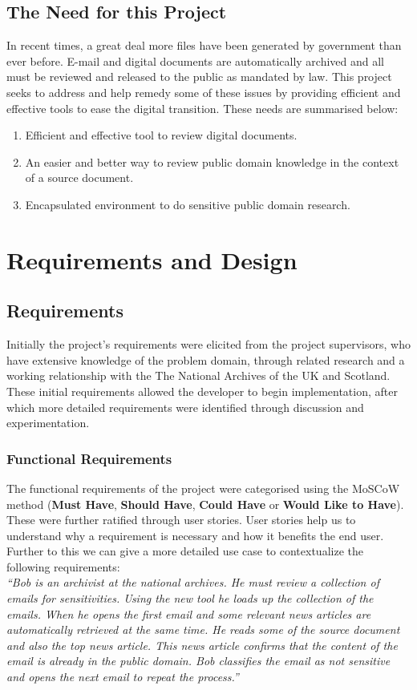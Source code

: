 \documentclass{l4proj}
\begin{document}
\section{The Need for this Project}
In recent times, a great deal more files have been generated by government than ever before. E-mail and digital documents are automatically archived and all must be reviewed and released to the public as mandated by law.
This project seeks to address and help remedy some of these issues by providing efficient and effective tools to ease the digital transition.
These needs are summarised below:
\begin{center}
\begin{enumerate}[label=\textbf{Need.\arabic*}]
\item Efficient and effective tool to review digital documents.
\item An easier and better way to review public domain knowledge in the context of a source document.
\item Encapsulated environment to do sensitive public domain research.
\end{enumerate}
\end{center}

\chapter{Requirements and Design} \label{requirementsanddesign}
\section{Requirements}
Initially the project's requirements were elicited from the project supervisors, who have extensive knowledge of the problem domain, through related research and a working relationship with the The National Archives of the UK and Scotland.
These initial requirements allowed the developer to begin implementation, after which more detailed requirements were identified through discussion and experimentation.

\subsection{Functional Requirements}
The functional requirements of the project were categorised using the MoSCoW method (\textbf{Must Have}, \textbf{Should Have}, \textbf{Could Have} or \textbf{Would Like to Have}). These were further ratified through user stories. User stories help us to understand why a requirement is necessary and how it benefits the end user. Further to this we can give a more detailed use case to contextualize the following requirements:\\ 
\textit{``Bob is an archivist at the national archives. He must review a collection of emails for sensitivities. Using the new tool he loads up the collection of the emails. When he opens the first email and some relevant news articles are automatically retrieved at the same time. He reads some of the source document and also the top news article. This news article confirms that the content of the email is already in the public domain. Bob classifies the email as not sensitive and opens the next email to repeat the process.''}
\end{document}
